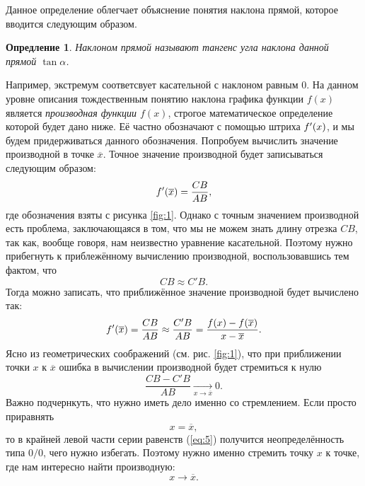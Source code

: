 \documentclass[12pt]{article}
\newtheorem{definition}{Опредление}[section]
\begin{document}
Данное определение облегчает объяснение понятия наклона прямой, которое вводится следующим образом.
\begin{definition}
Наклоном прямой называют тангенс угла наклона данной прямой $\tan{\alpha}$.
\end{definition}
Например, экстремум соответсвует касательной с наклоном равным $0$. На данном уровне описания тождественным понятию наклона графика функции $f(x)$ является \emph{производная функции $f(x)$}, строгое математическое определение которой будет дано ниже. Её частно обозначают с помощью штриха $f'\qty(x)$, и мы будем придерживаться данного обозначения. Попробуем вычислить значение производной в точке $\overline{x}$. Точное значение производной будет записываться следующим образом:
\begin{equation}
     f'\qty(\overline{x}) = \dfrac{CB}{AB},
\end{equation}
где обозначения взяты с рисунка \ref{fig:1}. Однако с точным значением производной есть проблема, заключающаяся в том, что мы не можем знать длину отрезка $CB$, так как, вообще говоря, нам неизвестно уравнение касательной. Поэтому нужно прибегнуть к приблежённому вычислению производной, воспользовавшись тем фактом, что 
\begin{equation}
    CB \approx C'B.
\end{equation}
Тогда можно записать, что приближённое значение производной будет вычислено так:
\begin{equation}\label{eq:5}
     f'\qty(\overline{x}) = \dfrac{CB}{AB} \approx \dfrac{C'B}{AB} = \dfrac{f(x) - f(\overline{x})}{ x-\overline{x}}.
\end{equation}
Ясно из геометрических соображений (см. рис. \ref{fig:1}), что при приближении точки $x$ к $\overline{x}$ ошибка в вычислении производной будет стремиться к нулю
\begin{equation}
    \dfrac{CB - C'B}{AB} \underset{x\rightarrow \overline{x}}{\longrightarrow} 0.
\end{equation}
Важно подчернкуть, что нужно иметь дело именно со стремлением. Если просто приравнять
\begin{equation}
    x = \overline{x},
\end{equation}
то в крайней левой части серии равенств (\ref{eq:5}) получится неопределённость типа $0/0$, чего нужно избегать. Поэтому нужно именно стремить точку $x$ к точке, где нам интересно найти производную:
\begin{equation}
    x\rightarrow \overline{x}.
\end{equation}
\end{document}

